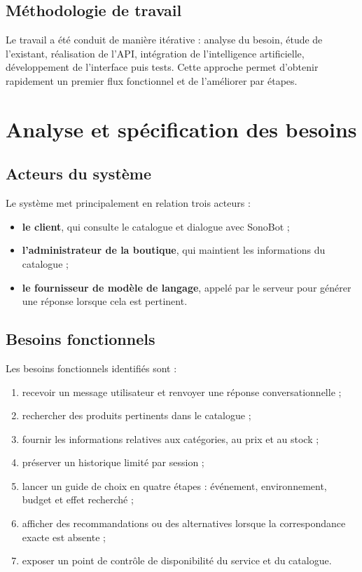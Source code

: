 \documentclass[12pt,a4paper,oneside]{report}
\begin{document}
\section{Méthodologie de travail}
Le travail a été conduit de manière itérative : analyse du besoin, étude de l'existant, réalisation de l'API, intégration de l'intelligence artificielle, développement de l'interface puis tests. Cette approche permet d'obtenir rapidement un premier flux fonctionnel et de l'améliorer par étapes.

\chapter{Analyse et spécification des besoins}
\section{Acteurs du système}
Le système met principalement en relation trois acteurs :
\begin{itemize}
  \item \textbf{le client}, qui consulte le catalogue et dialogue avec SonoBot ;
  \item \textbf{l'administrateur de la boutique}, qui maintient les informations du catalogue ;
  \item \textbf{le fournisseur de modèle de langage}, appelé par le serveur pour générer une réponse lorsque cela est pertinent.
\end{itemize}

\section{Besoins fonctionnels}
Les besoins fonctionnels identifiés sont :
\begin{enumerate}
  \item recevoir un message utilisateur et renvoyer une réponse conversationnelle ;
  \item rechercher des produits pertinents dans le catalogue ;
  \item fournir les informations relatives aux catégories, au prix et au stock ;
  \item préserver un historique limité par session ;
  \item lancer un guide de choix en quatre étapes : événement, environnement, budget et effet recherché ;
  \item afficher des recommandations ou des alternatives lorsque la correspondance exacte est absente ;
  \item exposer un point de contrôle de disponibilité du service et du catalogue.
\end{enumerate}
\end{document}
